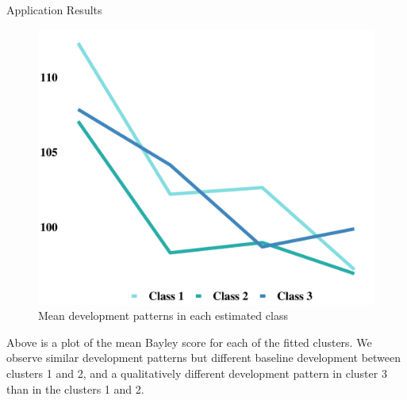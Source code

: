 \documentclass[final]{beamer}
\newlength{\onecolwid}
\begin{document}
\begin{frame}[t]
\begin{columns}[t]
\begin{column}{\onecolwid}
\begin{block}{Application Results}
\begin{figure}
\includegraphics[height=0.8\linewidth,width=1\linewidth]{clust_trends.pdf}
\caption{Mean development patterns in each estimated class}
\end{figure}

Above is a plot of the mean Bayley score for each of the fitted clusters. We observe similar development patterns but different baseline development between clusters 1 and 2, and a qualitatively different development pattern in cluster 3 than in the clusters 1 and 2. 


\end{block}













\end{column}
\end{columns}
\end{frame}
\end{document}
